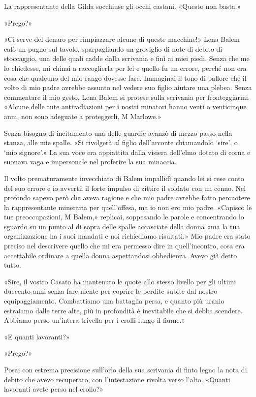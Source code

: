 La rappresentante della Gilda socchiuse gli occhi castani. «Questo non
basta.»

«Prego?»

«Ci serve del denaro per rimpiazzare alcune di queste macchine!» Lena
Balem calò un pugno sul tavolo, sparpagliando un groviglio di note di
debito di stoccaggio, una delle quali cadde dalla scrivania e finì ai
miei piedi. Senza che me lo chiedesse, mi chinai a raccoglierla per lei
e quello fu un errore, perché non era cosa che qualcuno del mio rango
dovesse fare. Immaginai il tono di pallore che il volto di mio padre
avrebbe assunto nel vedere suo figlio aiutare una plebea. Senza
commentare il mio gesto, Lena Balem si protese sulla scrivania per
fronteggiarmi. «Alcune delle tute antiradiazioni per i nostri minatori
hanno venti o venticinque anni, non sono adeguate a proteggerli, M
Marlowe.»

Senza bisogno di incitamento una delle guardie avanzò di mezzo passo
nella stanza, alle mie spalle. «Si rivolgerà al figlio dell'arconte
chiamandolo `sire', o `mio signore'.» La sua voce era appiattita dalla
visiera dell'elmo dotato di corna e suonava vaga e impersonale nel
proferire la sua minaccia.

Il volto prematuramente invecchiato di Balem impallidì quando lei si
rese conto del suo errore e io avvertii il forte impulso di zittire il
soldato con un cenno. Nel profondo sapevo però che aveva {ragione} e che
mio padre avrebbe fatto percuotere la rappresentante mineraria per
quell'offesa, ma io non ero mio padre. «Capisco le tue preoccupazioni, M
Balem,» replicai, soppesando le parole e concentrando lo sguardo su un
punto al di sopra delle spalle accasciate della donna «ma la tua
organizzazione ha i suoi mandati e noi richiediamo risultati.» Mio padre
era stato preciso nel descrivere quello che mi era permesso dire in
quell'incontro, cosa era accettabile ordinare a quella donna
aspettandosi obbedienza. Avevo già detto tutto.

«Sire, il vostro Casato ha mantenuto le quote allo stesso livello per
gli ultimi duecento anni senza fare niente per coprire le perdite subite
dal nostro equipaggiamento. Combattiamo una battaglia persa, e quanto
più uranio estraiamo dalle terre alte, più in profondità è inevitabile
che si debba scendere. Abbiamo perso un'intera trivella per i crolli
lungo il fiume.»

«E quanti lavoranti?»

«Prego?»

Posai con estrema precisione sull'orlo della sua scrivania di finto
legno la nota di debito che avevo recuperato, con l'intestazione rivolta
verso l'alto. «Quanti lavoranti avete perso nel crollo?»

